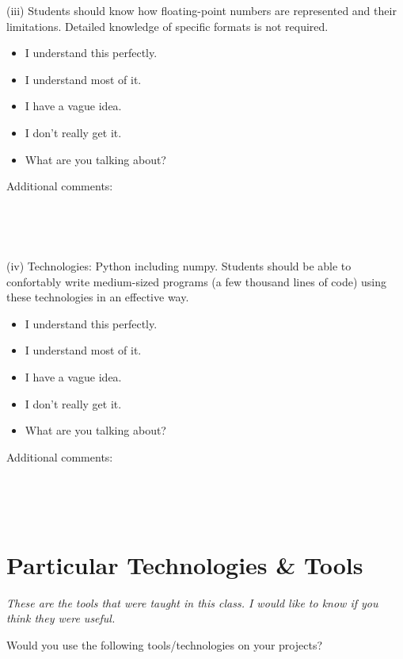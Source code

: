\documentclass[article,twoside]{memoir}
\newcommand*{\fillunderscore}{~\hrulefill}
\newcommand*{\checkbox}{$\square$}
\newcommand{\header}[1]{\textsl{#1}\par\medskip}
\begin{document}
    (iii) Students should know how floating-point numbers are represented and their limitations. Detailed knowledge of specific formats is not required.
\begin{itemize}[\checkbox]
\item I understand this perfectly.
\item I understand most of it.
\item I have a vague idea.
\item I don't really get it.
\item What are you talking about?
\end{itemize}
Additional comments:
\fillunderscore\par
\fillunderscore\par
\fillunderscore\par


    (iv) Technologies: Python including numpy. Students should be able to confortably write medium-sized programs (a few thousand lines of code) using these technologies in an effective way.

\begin{itemize}[\checkbox]
\item I understand this perfectly.
\item I understand most of it.
\item I have a vague idea.
\item I don't really get it.
\item What are you talking about?
\end{itemize}
Additional comments:
\fillunderscore\par
\fillunderscore\par
\fillunderscore\par


\section{Particular Technologies \& Tools}

\header{These are the tools that were taught in this class. I would like to know if you think they were useful.}

Would you use the following tools/technologies on your projects?
\end{document}
